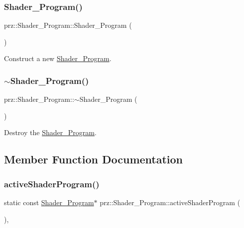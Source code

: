 \subsubsection{\texorpdfstring{Shader\_Program()}{Shader\_Program()}}
{\footnotesize\ttfamily prz\+::\+Shader\+\_\+\+Program\+::\+Shader\+\_\+\+Program (\begin{DoxyParamCaption}{ }\end{DoxyParamCaption})\hspace{0.3cm}{\ttfamily [inline]}}



Construct a new \mbox{\hyperlink{classprz_1_1_shader___program}{Shader\+\_\+\+Program}}. 

\mbox{\label{classprz_1_1_shader___program_af7a5d1bcb0991735702b6410a5015e77}} 
\subsubsection{\texorpdfstring{$\sim$Shader\_Program()}{~Shader\_Program()}}
{\footnotesize\ttfamily prz\+::\+Shader\+\_\+\+Program\+::$\sim$\+Shader\+\_\+\+Program (\begin{DoxyParamCaption}{ }\end{DoxyParamCaption})\hspace{0.3cm}{\ttfamily [inline]}}



Destroy the \mbox{\hyperlink{classprz_1_1_shader___program}{Shader\+\_\+\+Program}}. 



\subsection{Member Function Documentation}
\mbox{\label{classprz_1_1_shader___program_acdfd5708b9913d50047ffafb0fd2fa36}} 
\subsubsection{\texorpdfstring{activeShaderProgram()}{activeShaderProgram()}}
{\footnotesize\ttfamily static const \mbox{\hyperlink{classprz_1_1_shader___program}{Shader\+\_\+\+Program}}$\ast$ prz\+::\+Shader\+\_\+\+Program\+::active\+Shader\+Program (\begin{DoxyParamCaption}{ }\end{DoxyParamCaption})\hspace{0.3cm}{\ttfamily [inline]}, {\ttfamily [static]}}




